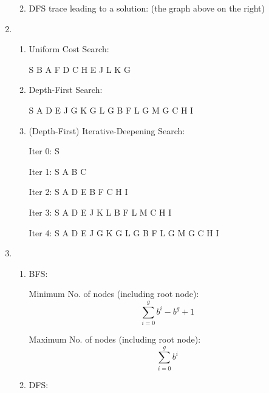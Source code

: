 \documentclass{article}
\begin{document}
\begin{enumerate}
\begin{enumerate}

\item DFS trace leading to a solution: (the graph above on the right)

\end{enumerate}


\item

\begin{enumerate}
\item Uniform Cost Search:
  
  S B A F D C H E J L K G

\item Depth-First Search:

  S A D E J G K G L G B F L G M G C H I

\item (Depth-First) Iterative-Deepening Search:

  Iter 0: S

  Iter 1: S A B C
  
  Iter 2: S A D E B F C H I
  
  Iter 3: S A D E J K L B F L M C H I
  
  Iter 4: S A D E J G K G L G B F L G M G C H I


\end{enumerate}


\item

\begin{enumerate}
\item BFS:

  Minimum No. of nodes (including root node): $${\sum_{i=0}^g b^i} - b^g + 1$$

  Maximum No. of nodes (including root node): $$\sum_{i=0}^g b^i$$

\item DFS:


\end{enumerate}
\end{enumerate}
\end{document}

